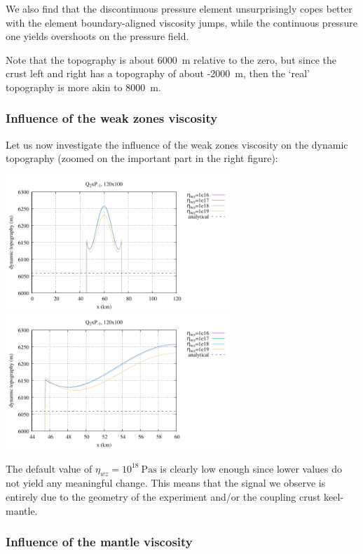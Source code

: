 We also find that the discontinuous pressure element unsurprisingly copes better 
with the element boundary-aligned viscosity jumps, while the continuous pressure 
one yields overshoots on the pressure field.

Note that the topography is about 6000~\si{\meter} relative to the zero, but since the 
crust left and right has a topography of about -2000~\si{\meter}, then the `real' 
topography is more akin to 8000~\si{\meter}.

\subsubsection*{Influence of the weak zones viscosity}

Let us now investigate the influence of the weak zones viscosity on the 
dynamic topography (zoomed on the important part in the right figure):
\begin{center}
\includegraphics[width=8.5cm]{python_codes/fieldstone_160/results/dyn_topo3a.pdf}
\includegraphics[width=8.5cm]{python_codes/fieldstone_160/results/dyn_topo3b.pdf}
\end{center}
The default value of $\eta_{wz}=10^{18}~\si{\pascal\second}$ is clearly low enough since lower values do not 
yield any meaningful change. This means that the signal we observe is entirely due
to the geometry of the experiment and/or the coupling crust keel-mantle.

\subsubsection*{Influence of the mantle viscosity}

